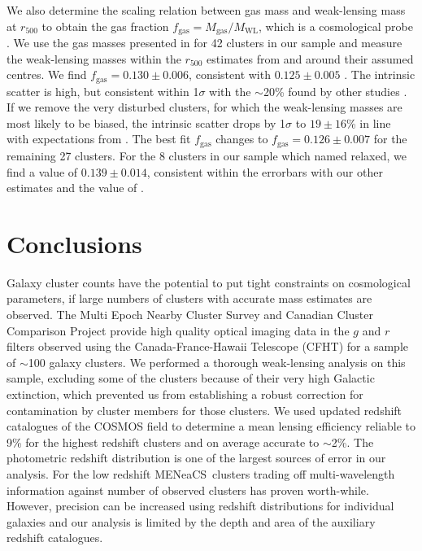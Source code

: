 \documentclass[useAMS,usenatbib]{mnras}
\newcommand{\mn}{MENeaCS}
\begin{document}
We also determine the scaling relation between gas mass and weak-lensing mass at $r_{500}$ to obtain the gas fraction $f_\mathrm{gas}=M_\mathrm{gas}/M_\mathrm{WL}$, which is a cosmological probe \citep[e.g.][]{mantz14}. We use the gas masses presented in \citet{mantz16} for 42 clusters in our sample and measure the weak-lensing masses within the $r_{500}$ estimates from  \citet{mantz16} and around their assumed centres. We find $f_\mathrm{gas}=0.130 \pm 0.006$, consistent with $0.125 \pm 0.005$ \citep{mantz16}. The intrinsic scatter is high, but consistent within 1$\sigma$ with the $\sim$20\% found by other studies \citep{becker11, mahdavi13, farahi18}. If we remove the very disturbed clusters, for which the weak-lensing masses are most likely to be biased, the intrinsic scatter drops by 1$\sigma$ to $19 \pm 16$\% in line with expectations from \citet[e.g.][]{applegate16}. The best fit $f_\mathrm{gas}$ changes to $f_\mathrm{gas}=0.126 \pm 0.007$ for the remaining 27 clusters. For the 8 clusters in our sample which \citet{mantz15b} named relaxed, we find a value of $0.139 \pm 0.014$, consistent within the errorbars with our other estimates and the value of \citet{mantz16}. 







\section{Conclusions}
\label{sec:conclusions}

Galaxy cluster counts have the potential to put tight constraints on cosmological parameters, if large numbers of clusters with accurate mass estimates are observed. 
The Multi Epoch Nearby Cluster Survey and Canadian Cluster Comparison Project provide high quality optical imaging data in the $g$ and $r$ filters observed using the Canada-France-Hawaii Telescope (CFHT) for a sample of $\sim$100 galaxy clusters. We performed a thorough weak-lensing analysis on this sample, excluding some of the clusters because of their very high Galactic extinction, which prevented us from establishing a robust correction for contamination by cluster members for those clusters. 
We used updated redshift catalogues of the COSMOS field to determine a mean lensing efficiency reliable to 9\% for the highest redshift clusters and on average accurate to $\sim$2\%. The photometric redshift distribution is one of the largest sources of error in our analysis. 
For the low redshift \mn \ clusters trading off multi-wavelength information against number of observed clusters has proven worth-while. However, precision can be increased using redshift distributions for individual galaxies \citep{applegate14} and our analysis is limited by the depth and area of the auxiliary redshift catalogues.
\end{document}
